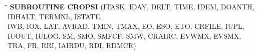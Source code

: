 \documentclass[11pt]{article}
\begin{document}
\bigskip
\bigskip
\nwln
\begin{tabbing}
\hspace{1.27cm}\=\hspace{1.27cm}\=\hspace{1.27cm}\=\hspace{1.27cm}\=%
\hspace{1.27cm}\=\hspace{1.27cm}\=\hspace{1.27cm}\=\hspace{1.27cm}\=%
\hspace{1.27cm}\=\hspace{1.27cm}\=\kill
{\bf SUBROUTINE CROPSI}\> \> \> (ITASK, IDAY, DELT, TIME, IDEM, DOANTH, IDHALT, TERMNL, ISTATE,\\
 \>\> \> \>  IWB, IOX, LAT, AVRAD, TMIN, TMAX, EO, ESO, ETO, CRFILE, IUPL,\\
\>\> \> \>  IUOUT, IULOG, SM, SMO, SMFCF, SMW, CRAIRC, EVWMX, EVSMX,\\
 \>\> \> \>  TRA, FR, RRI, IAIRDU, RDI, RDMCR)
\end{tabbing}
\nwln
\end{document}
